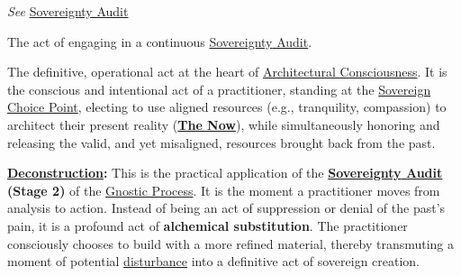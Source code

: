 \item[\hypertarget{gloss:sovereign_audit}{Sovereign Audit}] 
    \emph{See} \hyperlink{gloss:sovereignty_audit}{Sovereignty Audit}

\item[\hypertarget{gloss:sovereign_audits}{Sovereign Audits}]
    The act of engaging in a continuous \hyperlink{gloss:sovereignty_audit}{\hyperlink{gloss:sovereignty}{\hyperlink{gloss:sovereignty}{Sovereignty}} Audit}.

\item[\hypertarget{gloss:sovereign_choice}{Sovereign Choice}] 
    The definitive, operational act at the heart of \hyperlink{gloss:architectural_consciousness}{Architectural Consciousness}. It is the conscious and intentional act of a practitioner, standing at the \hyperlink{gloss:sovereign_choice_point}{Sovereign Choice Point}, electing to use aligned resources (e.g., tranquility, compassion) to architect their present reality (\textbf{\hyperlink{gloss:the_now}{The Now}}), while simultaneously honoring and releasing the valid, and yet misaligned, resources brought back from the past.
    \begin{nobullet}
        \item \textbf{\hyperlink{gloss:deconstruction}{Deconstruction}:} This is the practical application of the \textbf{\hyperlink{gloss:sovereignty_audit}{\hyperlink{gloss:sovereignty}{\hyperlink{gloss:sovereignty}{Sovereignty}} Audit} (Stage 2)} of the \hyperlink{gloss:gnostic_process}{Gnostic Process}. It is the moment a practitioner moves from analysis to action. Instead of being an act of suppression or denial of the past's pain, it is a profound act of \textbf{alchemical substitution}. The practitioner consciously chooses to build with a more refined material, thereby transmuting a moment of potential \hyperlink{gloss:disturbance}{disturbance} into a definitive act of sovereign creation.
    \end{nobullet}

